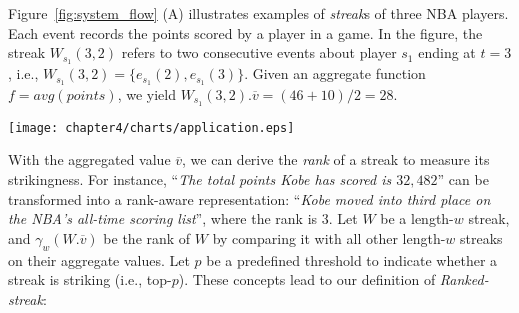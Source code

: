 \begin{example}
Figure~\ref{fig:system_flow} (A) illustrates examples of \textit{streak}s of three NBA players. 
Each event records the points scored by a player in a game. 
In the figure, the streak $W_{s_1}(3,2)$ refers to two consecutive events
about player $s_1$ ending at $t=3$, i.e., $W_{s_1}(3,2)=\{e_{s_1}(2), e_{s_1}(3)\}$. 
Given an aggregate function $f=avg(points)$,  we yield $W_{s_1}(3,2).\overline{v}=(46+10)/2=28$.
\end{example}

\begin{figure*}[t]
\centering
\texttt{[image: chapter4/charts/application.eps]}
	\caption{An illustration of $k$-Sketch query processing. 
(A): various streaks are formed based on events' sequence IDs. 
(B): streaks with rank greater than $p$ are filtered.
(C): ranked-streaks for each streak length.
(D): $k$-sketches are discovered for each subject from their ranked-streaks.
(E): newsworthy summary of a subject can be generated from its $k$-sketches.
}
\label{fig:system_flow}
\end{figure*}

With the aggregated value $\overline{v}$, we can derive the \emph{rank} of a streak
to measure its strikingness.
For instance, ``\textit{The total points Kobe has scored is $32,482$}'' can be transformed into a rank-aware representation: ``\textit{Kobe moved into third place on the NBA's all-time scoring list}'', where the rank is $3$. Let $W$ be a length-$w$ streak, and 
 $\gamma_w(W.\overline{v})$ be the rank of $W$ by comparing it with all other
length-$w$ streaks on their aggregate values. 
Let $p$ be a predefined threshold to indicate
whether a streak is striking (i.e., top-$p$). 
These concepts lead to our definition of  \emph{Ranked-streak}:


%

